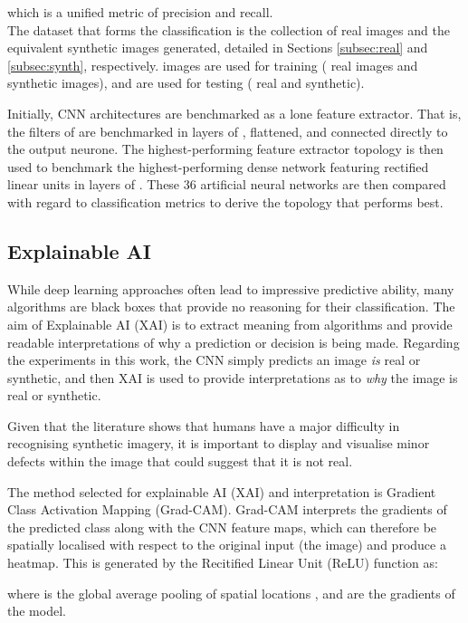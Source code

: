 \documentclass{article}
\begin{document}
\noindent which is a unified metric of precision and recall. \\

The dataset that forms the classification is the collection of real images and the equivalent synthetic images generated, detailed in Sections \ref{subsec:real} and \ref{subsec:synth}, respectively.  images are used for training ( real images and  synthetic images), and  are used for testing ( real and  synthetic).

Initially, CNN architectures are benchmarked as a lone feature extractor. That is, the filters of  are benchmarked in layers of , flattened, and connected directly to the output neurone. The highest-performing feature extractor topology is then used to benchmark the highest-performing dense network featuring  rectified linear units in layers of . These 36 artificial neural networks are then compared with regard to classification metrics to derive the topology that performs best. 

\subsection{Explainable AI}
\label{subsec:xai}
While deep learning approaches often lead to impressive predictive ability, many algorithms are black boxes that provide no reasoning for their classification. The aim of Explainable AI (XAI) is to extract meaning from algorithms and provide readable interpretations of why a prediction or decision is being made\cite{gunning2019xai}. Regarding the experiments in this work, the CNN simply predicts an image \textit{is} real or synthetic, and then XAI is used to provide interpretations as to \textit{why} the image is real or synthetic. 

Given that the literature shows that humans have a major difficulty in recognising synthetic imagery, it is important to display and visualise minor defects within the image that could suggest that it is not real.

The method selected for explainable AI (XAI) and interpretation is Gradient Class Activation Mapping (Grad-CAM)\cite{selvaraju2017grad}. Grad-CAM interprets the gradients of the predicted class along with the CNN feature maps, which can therefore be spatially localised with respect to the original input (the image) and produce a heatmap. This is generated by the Recitified Linear Unit (ReLU) function as:

where  is the global average pooling  of spatial locations , and  are the gradients of the model. 
\end{document}

